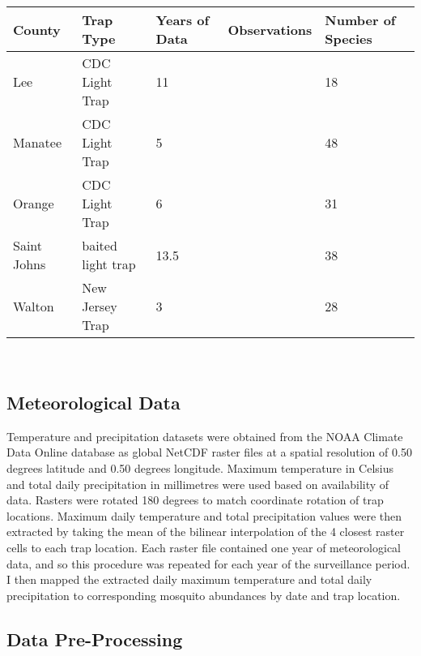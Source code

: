 \begin{center}
	\begin{tabularx}{7in}{ | L{0.4} | L{0.4} | L{0.4} | L{0.4} | L{0.4} |}
		\hline
		\textbf{County} & \textbf{Trap Type} &\textbf{Years of Data} & \textbf{Observations} & \textbf{Number of Species}\\\hline
		Lee & CDC Light Trap &11 & & 18\\\hline
		Manatee & CDC Light Trap & 5 & & 48\\\hline
		Orange & CDC Light Trap & 6 & & 31\\\hline
		Saint Johns & baited light trap & 13.5 & & 38\\\hline
		Walton & New Jersey Trap &3 & & 28\\\hline 
	\end{tabularx}\\
\end{center}	

\subsection{Meteorological Data}

Temperature and precipitation datasets were obtained from the NOAA Climate Data Online database as global NetCDF raster files at a spatial resolution of 0.50 degrees latitude and 0.50 degrees longitude. Maximum temperature in Celsius and total daily precipitation in millimetres were used based on availability of data. Rasters were rotated 180 degrees to match coordinate rotation of trap locations. Maximum daily temperature and total precipitation values were then extracted by taking the mean of the bilinear interpolation of the 4 closest raster cells to each trap location. Each raster file contained one year of meteorological data, and so this procedure was repeated for each year of the surveillance period. I then mapped the extracted daily maximum temperature and total daily precipitation to corresponding mosquito abundances by date and trap location. 


\subsection{Data Pre-Processing}

